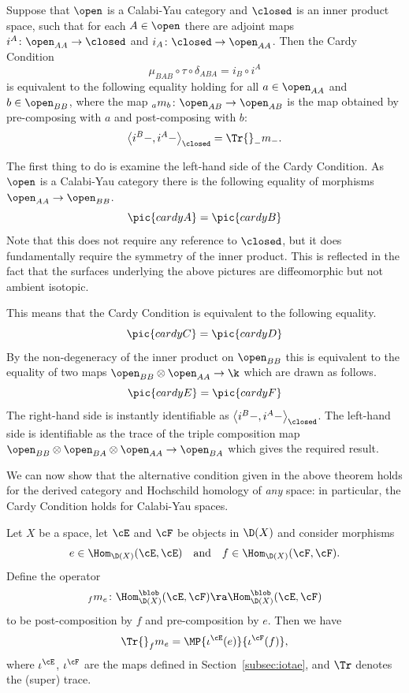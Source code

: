 \begin{Theorem}
  Suppose that $\open$ is a Calabi-Yau category and $\closed$ is an
  inner product space, such that for each $A\in \open$ there are
  adjoint maps $i^A\colon \open_{AA}\to \closed$ and $i_A\colon
  \closed \to \open_{AA}$.  Then the Cardy Condition
  \[\mu_{BAB}\circ\tau\circ\delta_{ABA}=i_B\circ i^A\]
  is equivalent to the following equality holding for all $a\in
  \open_{AA}$ and $b\in \open_{BB}$, where the map ${}_{a}m_{b}\colon
  \open_{AB}\to \open_{AB}$ is the map obtained by pre-composing with
  $a$ and post-composing with $b$:
  \[\left\langle i^B{-},i^A{-}\right\rangle_\closed=
  \Tr{}_{-}m_{-}.\]
\end{Theorem}

\begin{Proof}
  The first thing to do is examine the left-hand side of the Cardy
  Condition.  As $\open$ is a Calabi-Yau category there is the
  following equality of morphisms $\open_{AA}\to \open_{BB}$.
  \[\pic{cardyA}=\pic{cardyB}\]
  Note that this does not require any reference to $\closed$, but it
  does fundamentally require the symmetry of the inner product.  This
  is reflected in the fact that the surfaces underlying the above
  pictures are diffeomorphic but not ambient isotopic.

  This means that the Cardy Condition is equivalent to the following
  equality.
  \[\pic{cardyC}=\pic{cardyD}\]
  By the non-degeneracy of the inner product on $\open_{BB}$ this is
  equivalent to the equality of two maps $\open_{BB}\otimes
  \open_{AA}\to\k$ which are drawn as follows.
  \[\pic{cardyE}=\pic{cardyF}\]
  The right-hand side is instantly identifiable as $\left\langle
    i^B{-},i^A{-}\right\rangle_\closed$.  The left-hand side is
  identifiable as the trace of the triple composition map
  $\open_{BB}\otimes\open_{BA}\otimes\open_{AA}\to \open_{BA}$ which
  gives the required result.
\end{Proof}

We can now show that the alternative condition given in the above
theorem holds for the derived category and Hochschild homology of
\emph{any} space: in particular, the Cardy Condition holds for
Calabi-Yau spaces.

\begin{Theorem}
\label{thm:cardy}
Let $X$ be a space, let $\cE$ and $\cF$ be objects in $\D(X)$ and
consider morphisms
\[ e\in \Hom_{\D(X)}(\cE, \cE) \quad\text{and}\quad f\in
\Hom_{\D(X)}(\cF, \cF). \]
Define the operator
\[ {}_f m_e \colon\Hom^\blob_{\D(X)}(\cE, \cF) \ra
\Hom^\blob_{\D(X)}(\cE, \cF) \]
to be post-composition by $f$ and pre-composition by $e$.  Then we
have
\[ \Tr {}_f m_e=\MP{\iota^\cE(e)}{\iota^\cF(f)}, \]
where $\iota^\cE$, $\iota^\cF$ are the maps defined in
Section~\ref{subsec:iotae}, and $\Tr$ denotes the (super) trace.
\end{Theorem}

